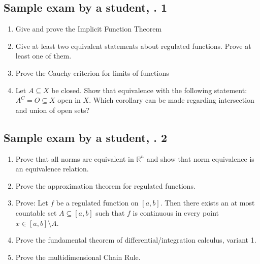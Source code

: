 \documentclass{article}
\begin{document}
\subsection{Sample exam by a student, \textnumero. 1}

\begin{enumerate}
  \item Give and prove the Implicit Function Theorem
  \item Give at least two equivalent statements about regulated functions. Prove at least one of them.
  \item Prove the Cauchy criterion for limits of functions
  \item Let $A \subseteq X$ be closed. Show that equivalence with the following statement: $A^C = O \subseteq X$ open in $X$.
    Which corollary can be made regarding intersection and union of open sets?
\end{enumerate}

\subsection{Sample exam by a student, \textnumero. 2}

\begin{enumerate}
  \item Prove that all norms are equivalent in $\mathbb R^n$ and show that norm equivalence is an equivalence relation.
  \item Prove the approximation theorem for regulated functions.
  \item Prove: Let $f$ be a regulated function on $[a,b]$. Then there exists an at most countable set $A \subseteq [a,b]$ such that $f$ is continuous in every point $x \in [a,b] \setminus A$.
  \item Prove the fundamental theorem of differential/integration calculus, variant 1.
  \item Prove the multidimensional Chain Rule.
\end{enumerate}

\printindex
\end{document}
